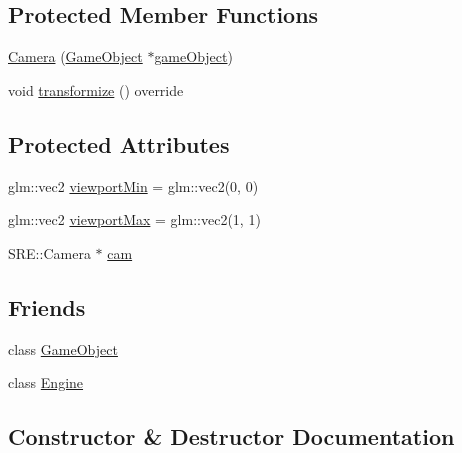 \subsection*{Protected Member Functions}
\begin{DoxyCompactItemize}
\item 
\hyperlink{class_mason_1_1_camera_aca4e1307d4601e7f0a711dfd94729143}{Camera} (\hyperlink{class_mason_1_1_game_object}{Game\+Object} $\ast$\hyperlink{class_mason_1_1_component_a30030370c35f5562cbbbb0927b0448c8}{game\+Object})
\item 
void \hyperlink{class_mason_1_1_camera_a27ff2d3ad004a49db2ae508ac6e9d3c2}{transformize} () override
\end{DoxyCompactItemize}
\subsection*{Protected Attributes}
\begin{DoxyCompactItemize}
\item 
glm\+::vec2 \hyperlink{class_mason_1_1_camera_a87d7d4111e63ecb41bac7ea33ef270e1}{viewport\+Min} = glm\+::vec2(0, 0)
\item 
glm\+::vec2 \hyperlink{class_mason_1_1_camera_a8c7510e4c83e123aebbe7bb36da80de9}{viewport\+Max} = glm\+::vec2(1, 1)
\item 
S\+R\+E\+::\+Camera $\ast$ \hyperlink{class_mason_1_1_camera_a74f870fa866086c21f28f0a1f59254cc}{cam}
\end{DoxyCompactItemize}
\subsection*{Friends}
\begin{DoxyCompactItemize}
\item 
class \hyperlink{class_mason_1_1_camera_a00df87c957d8f7ee0fc51f07a0542f4a}{Game\+Object}
\item 
class \hyperlink{class_mason_1_1_camera_a3e1914489e4bed4f9f23cdeab34a43dc}{Engine}
\end{DoxyCompactItemize}


\subsection{Constructor \& Destructor Documentation}
\hypertarget{class_mason_1_1_camera_ad1897942d0ccf91052386388a497349f}{}\label{class_mason_1_1_camera_ad1897942d0ccf91052386388a497349f} 
